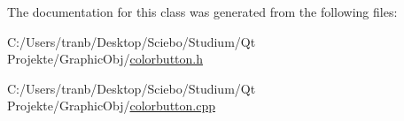 The documentation for this class was generated from the following files\+:\begin{DoxyCompactItemize}
\item 
C\+:/\+Users/tranb/\+Desktop/\+Sciebo/\+Studium/\+Qt Projekte/\+Graphic\+Obj/\hyperlink{colorbutton_8h}{colorbutton.\+h}\item 
C\+:/\+Users/tranb/\+Desktop/\+Sciebo/\+Studium/\+Qt Projekte/\+Graphic\+Obj/\hyperlink{colorbutton_8cpp}{colorbutton.\+cpp}\end{DoxyCompactItemize}
